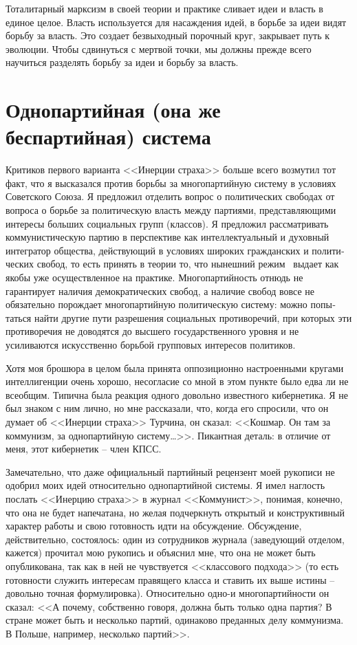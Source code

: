 \documentclass{book}
\begin{document}
Тоталитарный марксизм в своей теории и практике сливает идеи и власть в единое целое. Власть используется для насаж­дения идей, в борьбе за идеи видят борьбу за власть. Это со­здает безвыходный порочный круг, закрывает путь к эволю­ции. Чтобы сдвинуться с мертвой точки, мы должны прежде всего научиться разделять борьбу за идеи и борьбу за власть.


\section{Однопартийная (она же беспартийная) система}

Критиков первого варианта <<Инерции страха>> больше всего возмутил тот факт, что я высказался против борьбы за много­партийную систему в условиях Советского Союза. Я предло­жил отделить вопрос о политических свободах от вопроса о борьбе за политическую власть между партиями, представля­ющими интересы больших социальных групп (классов). Я предложил рассматривать коммунистическую партию в пер­спективе как интеллектуальный и духовный интегратор общества, действующий в условиях широких гражданских и полити­ческих свобод, то есть принять в теории то, что нынешний ре­жим  выдает как якобы уже осуществленное на практике. Многопартийность отнюдь не гарантирует наличия демократи­ческих свобод, а наличие свобод вовсе не обязательно порож­дает многопартийную политическую систему: можно попы­таться найти другие пути разрешения социальных противоре­чий, при которых эти противоречия не доводятся до высшего государственного уровня и не усиливаются искусственно борь­бой групповых интересов политиков.

Хотя моя брошюра в целом была принята оппозиционно настроенными кругами интеллигенции очень хорошо, несо­гласие со мной в этом пункте было едва ли не всеобщим. Ти­пична была реакция одного довольно известного кибернетика. Я не был знаком с ним лично, но мне рассказали, что, когда его спросили, что он думает об <<Инерции страха>> Турчина, он сказал: <<Кошмар. Он там за коммунизм, за однопартийную систему\ldots>>. Пикантная деталь: в отличие от меня, этот кибер­нетик -- член КПСС.

Замечательно, что даже официальный партийный рецензент моей рукописи не одобрил моих идей относительно однопар­тийной системы. Я имел наглость послать <<Инерцию страха>> в журнал <<Коммунист>>, понимая, конечно, что она не будет напечатана, но желая подчеркнуть открытый и конструктив­ный характер работы и свою готовность идти на обсуждение. Обсуждение, действительно, состоялось: один из сотрудников журнала (заведующий отделом, кажется) прочитал мою ру­копись и объяснил мне, что она не может быть опубликована, так как в ней не чувствуется <<классового подхода>> (то есть готовности служить интересам правящего класса и ставить их выше истины -- довольно точная формулировка). Относитель­но одно-и многопартийности он сказал: <<А почему, собствен­но говоря, должна быть только одна партия? В стране может быть и несколько партий, одинаково преданных делу комму­низма. В Польше, например, несколько партий>>.
\end{document}
